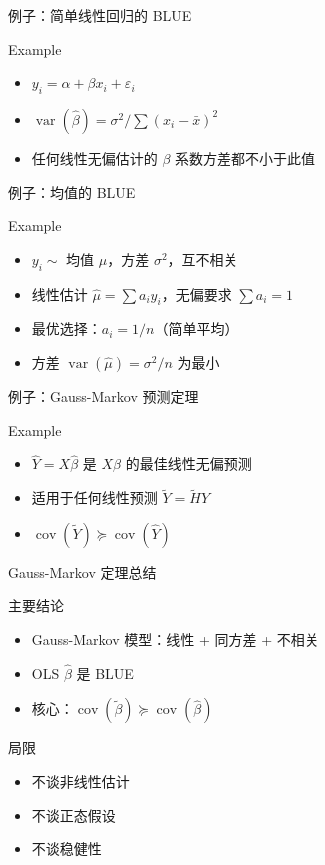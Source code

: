 \documentclass[]{beamer}
\DeclareMathOperator{\cov}{cov}
\DeclareMathOperator{\var}{var}
\begin{document}
\begin{frame}{例子：简单线性回归的 BLUE}
\begin{block}{Example}
\begin{itemize}
  \item $y_i = \alpha + \beta x_i + \varepsilon_i$
  \item $\var(\hat{\beta}) = \sigma^2 / \sum (x_i - \bar{x})^2$
  \item 任何线性无偏估计的 $\beta$ 系数方差都不小于此值
\end{itemize}
\end{block}
\end{frame}

\begin{frame}{例子：均值的 BLUE}
\begin{block}{Example}
\begin{itemize}
  \item $y_i \sim$ 均值 $\mu$，方差 $\sigma^2$，互不相关
  \item 线性估计 $\hat{\mu} = \sum a_i y_i$，无偏要求 $\sum a_i = 1$
  \item 最优选择：$a_i = 1/n$（简单平均）
  \item 方差 $\var(\hat{\mu}) = \sigma^2/n$ 为最小
\end{itemize}
\end{block}
\end{frame}

\begin{frame}{例子：Gauss-Markov 预测定理}
\begin{block}{Example}
\begin{itemize}
  \item $\hat{Y} = X\hat{\beta}$ 是 $X\beta$ 的最佳线性无偏预测
  \item 适用于任何线性预测 $\tilde{Y} = \tilde{H}Y$
  \item $\cov(\tilde{Y}) \succeq \cov(\hat{Y})$
\end{itemize}
\end{block}
\end{frame}

\begin{frame}{Gauss-Markov 定理总结}
\begin{block}{主要结论}
\begin{itemize}
  \item Gauss-Markov 模型：线性 + 同方差 + 不相关
  \item OLS $\hat{\beta}$ 是 BLUE
  \item 核心：$\cov(\tilde{\beta}) \succeq \cov(\hat{\beta})$
\end{itemize}
\end{block}
\vspace{1em}
\begin{alertblock}{局限}
\begin{itemize}
  \item 不谈非线性估计
  \item 不谈正态假设
  \item 不谈稳健性
\end{itemize}
\end{alertblock}
\end{frame}
\end{document}
